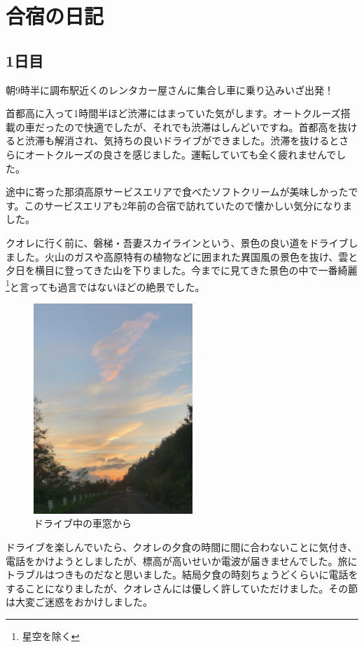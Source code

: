 \documentclass[../main]{subfiles}
\begin{document}
\section{合宿の日記}
\subsection{1日目}
朝9時半に調布駅近くのレンタカー屋さんに集合し車に乗り込みいざ出発！


首都高に入って1時間半ほど渋滞にはまっていた気がします。オートクルーズ搭載の車だったので快適でしたが、それでも渋滞はしんどいですね。首都高を抜けると渋滞も解消され、気持ちの良いドライブができました。渋滞を抜けるとさらにオートクルーズの良さを感じました。運転していても全く疲れませんでした。

途中に寄った那須高原サービスエリアで食べたソフトクリームが美味しかったです。このサービスエリアも2年前の合宿で訪れていたので懐かしい気分になりました。


クオレに行く前に、磐梯・吾妻スカイラインという、景色の良い道をドライブしました。火山のガスや高原特有の植物などに囲まれた異国風の景色を抜け、雲と夕日を横目に登ってきた山を下りました。今までに見てきた景色の中で一番綺麗\footnote{星空を除く}と言っても過言ではないほどの絶景でした。

\begin{figure}[H]
\includegraphics[width=6cm]{sections/Nakahara/IMG_8501.jpg}
\centering
\caption{ドライブ中の車窓から}
\end{figure}

ドライブを楽しんでいたら、クオレの夕食の時間に間に合わないことに気付き、電話をかけようとしましたが、標高が高いせいか電波が届きませんでした。旅にトラブルはつきものだなと思いました。結局夕食の時刻ちょうどくらいに電話をすることになりましたが、クオレさんには優しく許していただけました。その節は大変ご迷惑をおかけしました。
\end{document}
